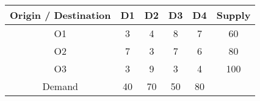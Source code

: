\begin{table}[h!]
\centering
\begin{tabular}{|c|c|c|c|c|c|}
\hline
Origin / Destination & D1 & D2 & D3 & D4 & Supply \\
\hline
O1 & 3 & 4 & 8 & 7 & 60 \\
\hline
O2 & 7 & 3 & 7 & 6 & 80 \\
\hline
O3 & 3 & 9 & 3 & 4 & 100 \\
\hline
Demand & 40 & 70 & 50 & 80 & \\
\hline
\end{tabular}
\end{table}